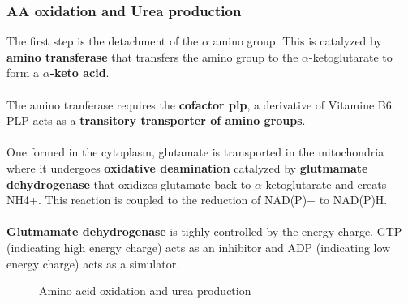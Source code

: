 \documentclass[../main.tex]{subfiles}
\begin{document}
\subsubsection{AA oxidation and Urea production}

The first step is the detachment of the $\alpha$ amino group. This is catalyzed by \textbf{amino transferase} that transfers the amino group to the $\alpha$-ketoglutarate to form a \textbf{$\alpha$-keto acid}. \\
\\
The amino tranferase requires the \textbf{cofactor \gls{plp}}, a derivative of Vitamine B6. PLP acts as a \textbf{transitory transporter of amino groups}. \\
\\
One formed in the cytoplasm, glutamate is transported in the mitochondria where it undergoes \textbf{oxidative deamination} catalyzed by \textbf{glutmamate dehydrogenase} that oxidizes glutamate back to $\alpha$-ketoglutarate and creats NH4+. This reaction is coupled to the reduction of NAD(P)+ to NAD(P)H. \\
\\
\textbf{Glutmamate dehydrogenase} is tighly controlled by the energy charge. GTP (indicating high energy charge) acts as an inhibitor and ADP (indicating low energy charge) acts as a simulator. 
 
\begin{figure}[H]
	\centering
	\caption{Amino acid oxidation and urea production}
\end{figure}
\end{document}
